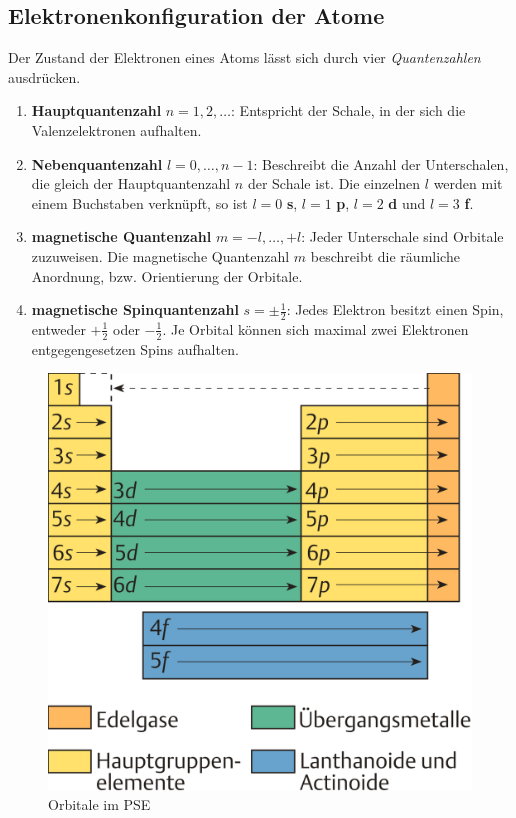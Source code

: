 \documentclass{scrartcl}
\begin{document}
\subsection{Elektronenkonfiguration der Atome}
Der Zustand der Elektronen eines Atoms lässt sich durch vier \emph{Quantenzahlen} ausdrücken. 
\begin{enumerate}
	\item \textbf{Hauptquantenzahl} $n=1,2,\dots$: Entspricht der Schale, in der sich die Valenzelektronen aufhalten. 
	\item \textbf{Nebenquantenzahl} $l=0,\dots,n-1$: Beschreibt die Anzahl der Unterschalen, die gleich der Hauptquantenzahl $n$ der Schale ist. Die einzelnen $l$ werden mit einem Buchstaben verknüpft, so ist $l=0$ \textbf{s}, $l=1$ \textbf{p}, $l=2$ \textbf{d} und $l=3$ \textbf{f}.
	\item \textbf{magnetische Quantenzahl} $m=-l,\dots,+l$: Jeder Unterschale sind Orbitale zuzuweisen. Die magnetische Quantenzahl $m$ beschreibt die räumliche Anordnung, bzw. Orientierung der Orbitale. 
	\item \textbf{magnetische Spinquantenzahl} $s=\pm\frac{1}{2}$: Jedes Elektron besitzt einen Spin, entweder $+\frac{1}{2}$ oder $-\frac{1}{2}$. Je Orbital können sich maximal zwei Elektronen entgegengesetzen Spins aufhalten. 
\end{enumerate}
\begin{figure}
	\centering
	\caption{Orbitale im PSE\protect\footnotemark}
	\includegraphics{Aufbauprinzip.png}
\end{figure}
\end{document}
